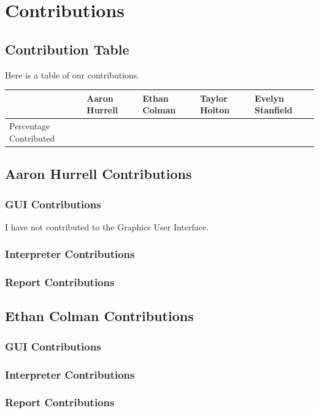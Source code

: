 \documentclass[a4paper, oneside, 11pt]{report}
\begin{document}
\appendix
\chapter{Contributions} 
\section{Contribution Table}
Here is a table of our contributions. \\

\begin{table}[h]
\begin{tabular}{|l|l|l|l|l|}
\hline
                       & Aaron Hurrell & Ethan Colman & Taylor Holton & Evelyn Stanfield \\ \hline
Percentage Contributed &               &              &               &                  \\ \hline
\end{tabular}
\end{table}

\section{Aaron Hurrell Contributions}
\subsection{GUI Contributions}
I have not contributed to the Graphics User Interface.
\subsection{Interpreter Contributions}
\subsection{Report Contributions}

\section{Ethan Colman Contributions}
\subsection{GUI Contributions}
\subsection{Interpreter Contributions}
\subsection{Report Contributions}
\end{document}
